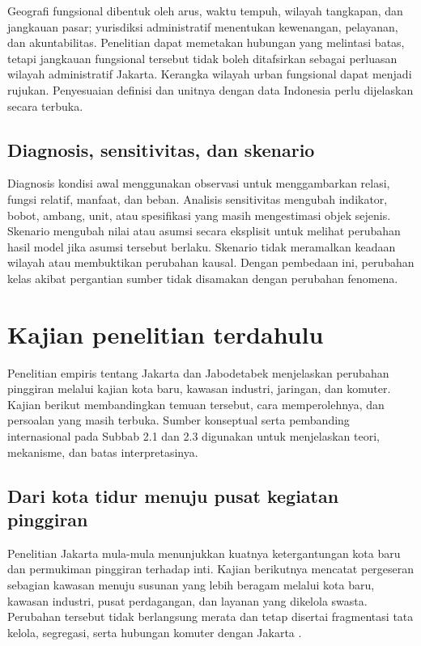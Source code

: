 \documentclass[12pt,a4paper,oneside,openany,indonesian]{report}
\begin{document}
Geografi fungsional dibentuk oleh arus, waktu tempuh, wilayah tangkapan, dan jangkauan pasar; yurisdiksi administratif menentukan kewenangan, pelayanan, dan akuntabilitas. Penelitian dapat memetakan hubungan yang melintasi batas, tetapi jangkauan fungsional tersebut tidak boleh ditafsirkan sebagai perluasan wilayah administratif Jakarta. Kerangka wilayah urban fungsional dapat menjadi rujukan. Penyesuaian definisi dan unitnya dengan data Indonesia perlu dijelaskan secara terbuka.

\subsection{Diagnosis, sensitivitas, dan skenario}

Diagnosis kondisi awal menggunakan observasi untuk menggambarkan relasi, fungsi relatif, manfaat, dan beban. Analisis sensitivitas mengubah indikator, bobot, ambang, unit, atau spesifikasi yang masih mengestimasi objek sejenis. Skenario mengubah nilai atau asumsi secara eksplisit untuk melihat perubahan hasil model jika asumsi tersebut berlaku. Skenario tidak meramalkan keadaan wilayah atau membuktikan perubahan kausal. Dengan pembedaan ini, perubahan kelas akibat pergantian sumber tidak disamakan dengan perubahan fenomena.

\section{Kajian penelitian terdahulu}

Penelitian empiris tentang Jakarta dan Jabodetabek menjelaskan perubahan pinggiran melalui kajian kota baru, kawasan industri, jaringan, dan komuter. Kajian berikut membandingkan temuan tersebut, cara memperolehnya, dan persoalan yang masih terbuka. Sumber konseptual serta pembanding internasional pada Subbab 2.1 dan 2.3 digunakan untuk menjelaskan teori, mekanisme, dan batas interpretasinya.

\subsection{Dari kota tidur menuju pusat kegiatan pinggiran}

Penelitian Jakarta mula-mula menunjukkan kuatnya ketergantungan kota baru dan permukiman pinggiran terhadap inti. Kajian berikutnya mencatat pergeseran sebagian kawasan menuju susunan yang lebih beragam melalui kota baru, kawasan industri, pusat perdagangan, dan layanan yang dikelola swasta. Perubahan tersebut tidak berlangsung merata dan tetap disertai fragmentasi tata kelola, segregasi, serta hubungan komuter dengan Jakarta \parencite{hudalahfirman2012,firmanfahmi2017}.
\end{document}

